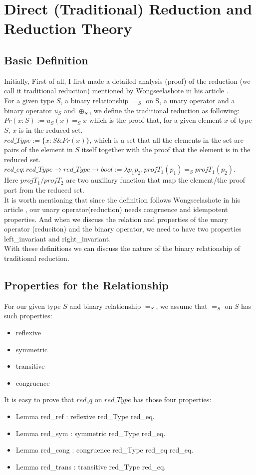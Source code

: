 \documentclass[a4paper,12pt,twoside,openright]{report}
\begin{document}
\section{Direct (Traditional) Reduction and Reduction Theory}
\subsection{Basic Definition}
Initially, First of all, I first made a detailed analysis (proof) of the reduction (we call it traditional reduction) mentioned by Wongseelashote in his article \cite{WONGSEELASHOTE197955}.\\
For a given type $S$, a binary relationship $=_S$ on S, a unary operator and a binary operator $u_S$ and $\oplus_S$, we define the traditional reduction as following:\\
$Pr (x : S) :=   u_S (x) =_S x$ which is the proof that, for a given element $x$ of type $S$, $x$ is in the reduced set.\\
$red\_Type := \{x : S \& Pr(x)\}$, which is a set that all the elements in the set are pairs of the element in $S$ itself together with the proof that the element is in the reduced set.\\
$red\_eq : red\_Type \rightarrow red\_Type \rightarrow bool 
:= \lambda p_1 p_2, projT_1 (p_1) =_S projT_1 (p_2)$. \\
Here $projT_1/projT_2$ are two 
auxiliary	function that map the element/the proof part from the reduced set.\\
It is worth mentioning that since the definition follows Wongseelashote in his article \cite{WONGSEELASHOTE197955}, our unary operator(reduction) needs congruence and idempotent properties.
And when we discuss the relation and properties of the unary operator (reduciton) and the binary operator, we need to have two properties left\_invariant and right\_invariant.
\\
With these definitions we can discuss the nature of the binary relationship of traditional reduction.
\subsection{Properties for the Relationship}
For our given type $S$ and binary relationship $=_S$, we assume that $=_S$ on $S$ has such properties:
\begin{itemize}
\item reflexive 
\item symmetric 
\item transitive 
\item congruence 
\end{itemize}
It is easy to prove that $red_eq$ on $red\_Type$ has those four properties:
\begin{itemize}
\item Lemma red\_ref : reflexive red\_Type red\_eq.
\item Lemma red\_sym : symmetric red\_Type red\_eq.
\item Lemma red\_cong : congruence red\_Type red\_eq red\_eq.  
\item Lemma red\_trans : transitive red\_Type red\_eq.  
\end{itemize}
\end{document}

